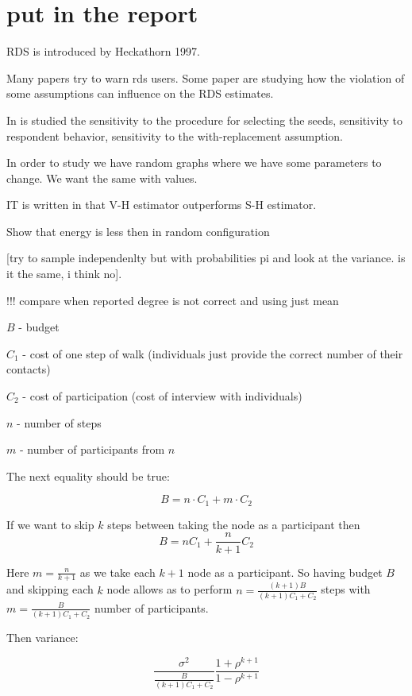 \documentclass[12pt]{report}
\begin{document}
\section{put in the report}

RDS is introduced by Heckathorn 1997.

Many papers try to warn rds users.
Some paper are studying how the violation of some assumptions can influence on the RDS estimates.

In \cite{gile2010respondent} is studied  the sensitivity to the procedure for selecting the seeds, sensitivity to respondent behavior, sensitivity to the with-replacement assumption.

In order to study we have random graphs where we have some parameters to change. We want the same with values.



IT is written in \cite{gile2010respondent} that V-H estimator outperforms S-H estimator.


Show that energy is less then in random configuration 

[try to sample independenlty but with probabilities pi and look at the variance. is it the same, i think no].



!!! compare when reported degree is not correct and using just mean


$B$ - budget

$C_1$ - cost of one step of walk (individuals just provide the correct number of their contacts)

$C_2$ - cost of participation (cost of interview with individuals)

$n$ - number of steps

$m$ - number of participants from $n$

The next equality should be true:

$$B = n \cdot C_1 + m \cdot C_2$$

If we want to skip $k$ steps between taking the node as a participant then
$$B = nC_1 + \frac{n}{k+1}C_2$$

Here $m = \frac{n}{k+1}$ as we take each $k+1$ node as a participant. So having budget $B$ and skipping each $k$ node allows as to perform $n = \frac{(k+1)B}{(k+1)C_1 + C_2}$ steps with $m = \frac{B}{(k+1)C_1 + C_2}$ number of participants.

Then variance:

$$\frac{\sigma^2}{\frac{B}{(k+1)C_1 + C_2}} \frac{1+\rho^{k+1}}{1-\rho^{k+1}}$$ 
\end{document}
